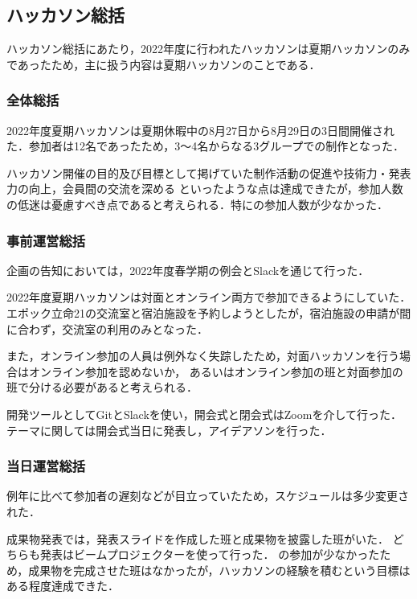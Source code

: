 \subsection*{ハッカソン総括}


ハッカソン総括にあたり，2022年度に行われたハッカソンは夏期ハッカソンのみであったため，主に扱う内容は夏期ハッカソンのことである．

\subsubsection*{全体総括}

2022年度夏期ハッカソンは夏期休暇中の8月27日から8月29日の3日間開催された．参加者は12名であったため，3〜4名からなる3グループでの制作となった．

ハッカソン開催の目的及び目標として掲げていた制作活動の促進や技術力・発表力の向上，会員間の交流を深める
といったような点は達成できたが，参加人数の低迷は憂慮すべき点であると考えられる．特に\thirdGrade{}の参加人数が少なかった．

\subsubsection*{事前運営総括}

企画の告知においては，2022年度春学期の例会とSlackを通じて行った．

2022年度夏期ハッカソンは対面とオンライン両方で参加できるようにしていた．
エポック立命21の交流室と宿泊施設を予約しようとしたが，宿泊施設の申請が間に合わず，交流室の利用のみとなった．

また，オンライン参加の人員は例外なく失踪したため，対面ハッカソンを行う場合はオンライン参加を認めないか，
あるいはオンライン参加の班と対面参加の班で分ける必要があると考えられる．

開発ツールとしてGitとSlackを使い，開会式と閉会式はZoomを介して行った．
テーマに関しては開会式当日に発表し，アイデアソンを行った．

\subsubsection*{当日運営総括}

例年に比べて参加者の遅刻などが目立っていたため，スケジュールは多少変更された．

成果物発表では，発表スライドを作成した班と成果物を披露した班がいた．
どちらも発表はビームプロジェクターを使って行った．
\thirdGrade{}の参加が少なかったため，成果物を完成させた班はなかったが，ハッカソンの経験を積むという目標はある程度達成できた．

